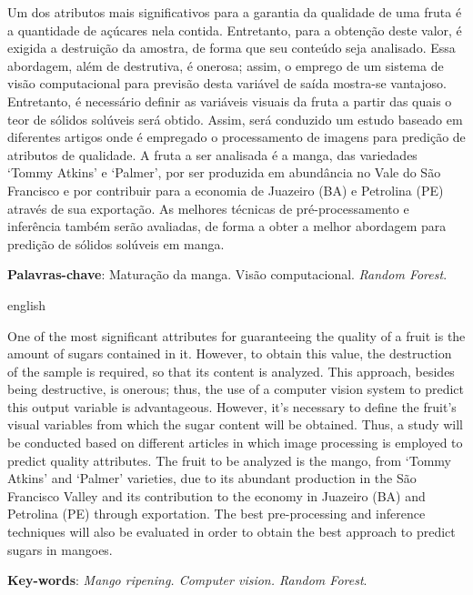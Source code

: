 \setlength{\absparsep}{18pt} %
\begin{resumo}

Um dos atributos mais significativos para a garantia da qualidade de uma fruta é a quantidade de açúcares nela contida. Entretanto, para a obtenção deste valor, é exigida a destruição da amostra, de forma que seu conteúdo seja analisado. Essa abordagem, além de destrutiva, é onerosa; assim, o emprego de um sistema de visão computacional para previsão desta variável de saída mostra-se vantajoso. Entretanto, é necessário definir as variáveis visuais da fruta a partir das quais o teor de sólidos solúveis será obtido. Assim, será conduzido um estudo baseado em diferentes artigos onde é empregado o processamento de imagens para predição de atributos de qualidade. A fruta a ser analisada é a manga, das variedades ‘Tommy Atkins’ e ‘Palmer’, por ser produzida em abundância no Vale do São Francisco e por contribuir para a economia de Juazeiro (BA) e Petrolina (PE) através de sua exportação. As melhores técnicas de pré-processamento e inferência também serão avaliadas, de forma a obter a melhor abordagem para predição de sólidos solúveis em manga. 

 \textbf{Palavras-chave}: Maturação da manga. Visão computacional. \textit{Random Forest}.

\end{resumo}

\begin{resumo}[Abstract]
\begin{otherlanguage*}{english}

One of the most significant attributes for guaranteeing the quality of a fruit is the amount of sugars contained in it. However, to obtain this value, the destruction of the sample is required, so that its content is analyzed. This approach, besides being destructive, is onerous; thus, the use of a computer vision system to predict this output variable is advantageous. However, it’s necessary to define the fruit’s visual variables from which the sugar content will be obtained. Thus, a study will be conducted based on different articles in which image processing is employed to predict quality attributes. The fruit to be analyzed is the mango, from ‘Tommy Atkins’ and ‘Palmer’ varieties, due to its abundant production in the São Francisco Valley and its contribution to the economy in Juazeiro (BA) and Petrolina (PE) through exportation. The best pre-processing and inference techniques will also be evaluated in order to obtain the best approach to predict sugars in mangoes.  
	\vspace{\onelineskip}

	\noindent
	\textbf{Key-words}: \textit{Mango ripening. Computer vision. Random Forest}.

\end{otherlanguage*}
\end{resumo}


